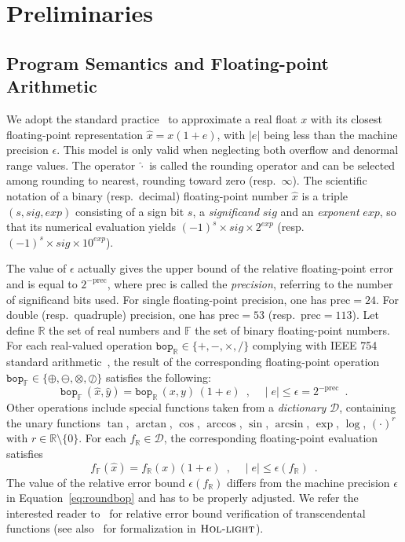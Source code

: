 \documentclass[preprint]{sigplanconf}
\newcommand{\setD}{\mathcal{D}} %
\newcommand{\R}{\mathbb{R}}
\newcommand{\F}{\mathbb{F}}
\renewcommand{\prec}{\text{prec}}
\newcommand{\hol}{\text{\sc Hol-light}}
\newcommand{\bop}{\mathtt{bop}}
\theoremstyle{plain}
\begin{document}
\section{Preliminaries}
\label{sec:background}

\subsection{Program Semantics and Floating-point Arithmetic}
\label{sec:fpbackground}
We adopt the standard practice~\cite{higham2002accuracy} to approximate a real float $x$ with its closest floating-point representation $\hat{x} = x (1 + e)$, with $|e|$ being less than the machine precision $\epsilon$. This model is only valid when neglecting both overflow and denormal range values.
The operator $\hat{\cdot}$ is called the rounding operator and can be selected among rounding to nearest, rounding toward zero (resp.~$\infty$).
The scientific notation of a binary (resp.~decimal) floating-point number $\hat{x}$ is a triple $(s, sig, exp)$ consisting of a sign bit $s$, a {\em significand} $sig$ and an {\em exponent} $exp$, so that its numerical evaluation yields $(-1)^{s} \times sig \times 2^{exp}$ (resp.~$(-1)^{s} \times sig \times 10^{exp}$). 

The value of $\epsilon$ actually gives the upper bound of the relative floating-point error and is equal to $2^{-\prec}$, where $\prec$ is called the {\em precision}, referring to the number of significand bits used. For single floating-point precision, one has $\prec = 24$. For double (resp.~quadruple) precision, one has $\prec = 53$ (resp.~$\prec=113$). Let define $\R$ the set of real numbers and $\F$ the set of binary floating-point numbers.
For each real-valued operation $\bop_\R \in \{+, -, \times, \slash \}$ complying with IEEE 754 standard arithmetic~\cite{IEEE}, the result of the corresponding floating-point operation $\bop_\F \in \{\oplus, \ominus, \otimes, \oslash \}$ satisfies the following:
\begin{equation}
\label{eq:roundbop}
\bop_\F \, (\hat{x}, \hat{y}) = \bop_\R \, (x, y) \, (1 + e) \enspace, \quad \mid e \mid \leq \epsilon = 2^{-\prec} \enspace.
\end{equation}
%
Other operations include special functions taken from a {\em dictionary} $\setD$, containing the unary functions
$\tan$, $\arctan$, $\cos$, $\arccos$, $\sin$, $\arcsin$, $\exp$, $\log$, $(\cdot)^{r}$ with $r\in \R\setminus\{0\}$. For each $f_\R \in \setD$, the corresponding floating-point evaluation satisfies 
\begin{equation}
\label{eq:roundtransc}
f_\F (\hat{x}) = f_\R (x) (1 + e) \enspace, \quad \mid e \mid \leq \epsilon (f_\R) \enspace.
\end{equation}
The value of the relative error bound $\epsilon (f_\R)$ differs from the machine precision $\epsilon$ in Equation~\eqref{eq:roundbop} and has to be properly adjusted. We refer the interested reader to~\cite{VerifCADTransc} for relative error bound verification of transcendental functions (see also~\cite{VerifHOLTransc} for formalization in $\hol$).
%
\end{document}
